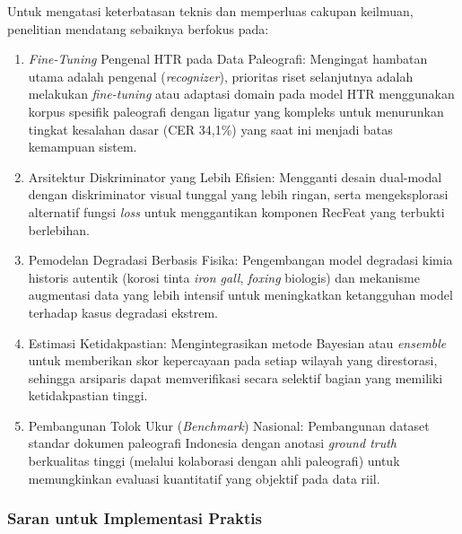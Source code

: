 Untuk mengatasi keterbatasan teknis dan memperluas cakupan keilmuan, penelitian mendatang sebaiknya berfokus pada:
\begin{enumerate}[leftmargin=1.5em, labelsep=0.5em, itemindent=0pt, noitemsep, topsep=0pt, partopsep=0pt]
  \item \textit{Fine-Tuning} Pengenal HTR pada Data Paleografi: Mengingat hambatan utama adalah pengenal (\textit{recognizer}), prioritas riset selanjutnya adalah melakukan \textit{fine-tuning} atau adaptasi domain pada model HTR menggunakan korpus spesifik paleografi dengan ligatur yang kompleks untuk menurunkan tingkat kesalahan dasar (CER 34,1\%) yang saat ini menjadi batas kemampuan sistem.

  \item Arsitektur Diskriminator yang Lebih Efisien: Mengganti desain dual-modal dengan diskriminator visual tunggal yang lebih ringan, serta mengeksplorasi alternatif fungsi \textit{loss} untuk menggantikan komponen RecFeat yang terbukti berlebihan.

  \item Pemodelan Degradasi Berbasis Fisika: Pengembangan model degradasi kimia historis autentik (korosi tinta \textit{iron gall}, \textit{foxing} biologis) dan mekanisme augmentasi data yang lebih intensif untuk meningkatkan ketangguhan model terhadap kasus degradasi ekstrem.

  \item Estimasi Ketidakpastian: Mengintegrasikan metode Bayesian atau \textit{ensemble} untuk memberikan skor kepercayaan pada setiap wilayah yang direstorasi, sehingga arsiparis dapat memverifikasi secara selektif bagian yang memiliki ketidakpastian tinggi.

  \item Pembangunan Tolok Ukur (\textit{Benchmark}) Nasional: Pembangunan dataset standar dokumen paleografi Indonesia dengan anotasi \textit{ground truth} berkualitas tinggi (melalui kolaborasi dengan ahli paleografi) untuk memungkinkan evaluasi kuantitatif yang objektif pada data riil.
\end{enumerate}



\subsubsection{Saran untuk Implementasi Praktis}
\label{subsubsec:saran-praktis}

